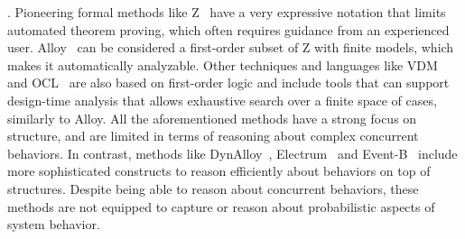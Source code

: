 \documentclass[10pt,journal,compsoc]{IEEEtran}
\begin{document}
\smallskip
{}. Pioneering formal methods like Z~\cite{DBLP:books/daglib/0068766} have a very expressive notation that limits automated theorem proving, which often requires guidance from an experienced user.
Alloy~\cite{DBLP:journals/tosem/Jackson02} can be considered a first-order subset of Z with finite models, which makes it automatically analyzable.
Other techniques and languages like VDM~\cite{DBLP:conf/msi/Bjorner78} and OCL~\cite{Warmer:2003:OCL:861416} are also based on first-order logic and include tools that can support design-time analysis that allows exhaustive search over a finite space of cases, similarly to Alloy. 
All the aforementioned methods have a strong focus on structure, and are limited in terms of reasoning about complex concurrent behaviors.
In contrast, methods like DynAlloy~\cite{DBLP:conf/icse/FriasGPA05}, Electrum~\cite{DBLP:conf/sigsoft/MacedoBCCK16} and Event-B~\cite{DBLP:books/daglib/0024570} include more sophisticated constructs to reason efficiently about behaviors on top of structures. %
Despite being able to reason about concurrent behaviors, these methods are not equipped to capture or reason about probabilistic aspects of system behavior. 


\usetikzlibrary{shapes,backgrounds}
\end{document}
